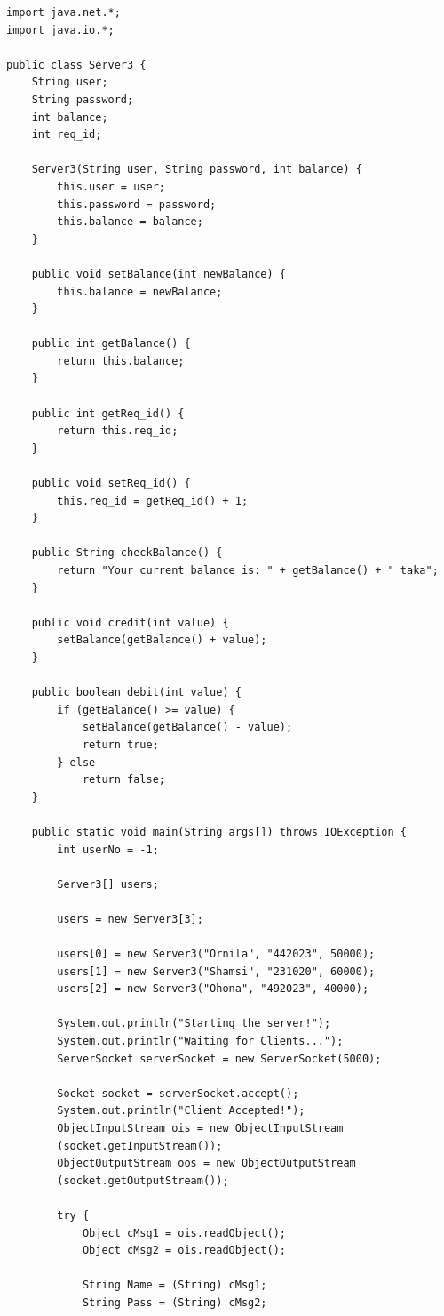 \documentclass[11pt]{article}
\begin{document}
\begin{verbatim}
import java.net.*;
import java.io.*;

public class Server3 {
    String user;
    String password;
    int balance;
    int req_id;

    Server3(String user, String password, int balance) {
        this.user = user;
        this.password = password;
        this.balance = balance;
    }

    public void setBalance(int newBalance) {
        this.balance = newBalance;
    }

    public int getBalance() {
        return this.balance;
    }

    public int getReq_id() {
        return this.req_id;
    }

    public void setReq_id() {
        this.req_id = getReq_id() + 1;
    }

    public String checkBalance() {
        return "Your current balance is: " + getBalance() + " taka";
    }

    public void credit(int value) {
        setBalance(getBalance() + value);
    }

    public boolean debit(int value) {
        if (getBalance() >= value) {
            setBalance(getBalance() - value);
            return true;
        } else
            return false;
    }

    public static void main(String args[]) throws IOException {
        int userNo = -1;

        Server3[] users;

        users = new Server3[3];

        users[0] = new Server3("Ornila", "442023", 50000);
        users[1] = new Server3("Shamsi", "231020", 60000);
        users[2] = new Server3("Ohona", "492023", 40000);

        System.out.println("Starting the server!");
        System.out.println("Waiting for Clients...");
        ServerSocket serverSocket = new ServerSocket(5000);

        Socket socket = serverSocket.accept();
        System.out.println("Client Accepted!");
        ObjectInputStream ois = new ObjectInputStream
        (socket.getInputStream());
        ObjectOutputStream oos = new ObjectOutputStream
        (socket.getOutputStream());

        try {
            Object cMsg1 = ois.readObject();
            Object cMsg2 = ois.readObject();

            String Name = (String) cMsg1;
            String Pass = (String) cMsg2;


\end{verbatim}
\end{document}

